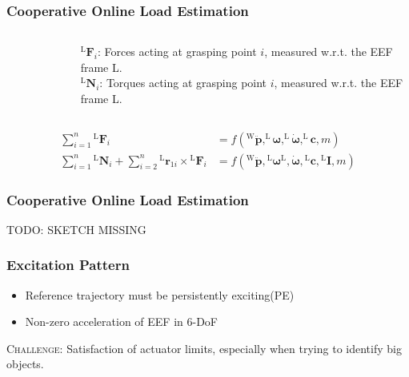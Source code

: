 \documentclass[student,noshadow]{ITRslides}
\renewcommand{\vec}[1]{\boldsymbol{#1}}
\renewcommand{\vec}[1]{\boldsymbol{#1}}
\newcommand{\scr}[1]{\mathrm{#1}}
\begin{document}
\begin{frame}
	\frametitle{Cooperative Online Load Estimation}
	\begin{columns}
			\begin{column}{0.5\textwidth}
				\begin{figure}
					\centering
					
				\end{figure}	
		 	\end{column}
		 	\begin{column}{0.5\textwidth}
		 	$^\scr{L}\vec{F}_i$: Forces acting at grasping point $i$, measured w.r.t. the EEF frame L.\\ \vspace{0.3cm}
		 	$^\scr{L}\vec{N}_i$: Torques acting at grasping point $i$, measured w.r.t. the EEF frame L.\\
		 	\end{column}
	\end{columns}

\begin{align*} 
\sum_{i = 1}^{n}  {^\scr{L}}\vec{F}_{i} &=  f\left(^\scr{W}\vec{\ddot{p}},^\scr{L}\vec{\omega},^\scr{L}\vec{\dot{\omega}},^\scr{L}\vec{c},m\right) \\ 
\sum_{i = 1}^n {^\scr{L}}\vec{N}_{i} + \sum_{i = 2}^n {^\scr{L}}\vec{r}_{1i} \times {^\scr{L}}\vec{F}_{i} &= f\left({^\scr{W}}\vec{\ddot{p}},{^\scr{L}}\vec{\omega}{^\scr{L}},\vec{\dot{\omega}},{^\scr{L}}\vec{c},{^\scr{L}}\vec{I},m\right)
\end{align*}
\end{frame}

\begin{frame}
	\frametitle{Cooperative Online Load Estimation}
	TODO: SKETCH MISSING
\end{frame}

\begin{frame}
	\frametitle{Excitation Pattern}
	\vspace{1cm}	
	\begin{itemize}
		\item Reference trajectory must be persistently exciting(PE)
		\item Non-zero acceleration of EEF in 6-DoF \cite{literaturstelle3}
	\end{itemize}
	\vspace{1cm}
	\textsc{Challenge}: Satisfaction of actuator limits, especially when trying to identify big objects.
\end{frame}
\end{document}
